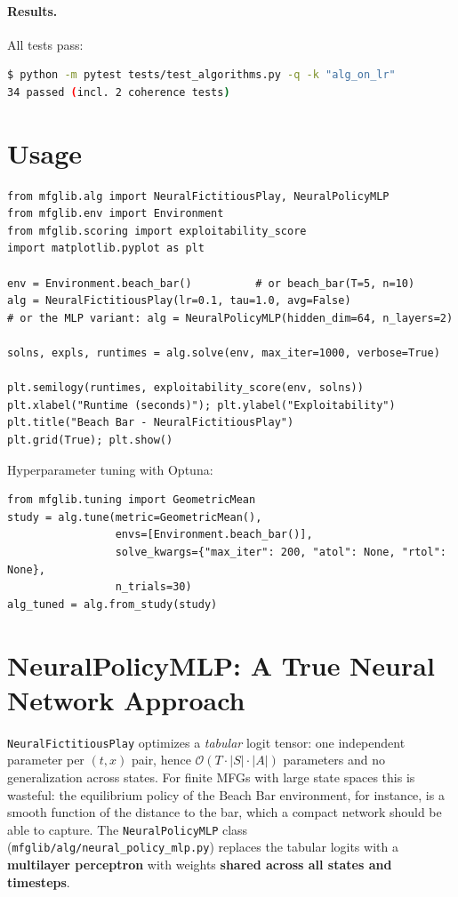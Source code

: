 \documentclass[11pt,a4paper]{article}
\begin{document}
\paragraph{Results.} All tests pass:
\begin{lstlisting}[language=bash]
$ python -m pytest tests/test_algorithms.py -q -k "alg_on_lr"
34 passed (incl. 2 coherence tests)
\end{lstlisting}

\section{Usage}

\begin{lstlisting}[style=py, caption={Solving the Beach Bar environment}]
from mfglib.alg import NeuralFictitiousPlay, NeuralPolicyMLP
from mfglib.env import Environment
from mfglib.scoring import exploitability_score
import matplotlib.pyplot as plt

env = Environment.beach_bar()          # or beach_bar(T=5, n=10)
alg = NeuralFictitiousPlay(lr=0.1, tau=1.0, avg=False)
# or the MLP variant: alg = NeuralPolicyMLP(hidden_dim=64, n_layers=2)

solns, expls, runtimes = alg.solve(env, max_iter=1000, verbose=True)

plt.semilogy(runtimes, exploitability_score(env, solns))
plt.xlabel("Runtime (seconds)"); plt.ylabel("Exploitability")
plt.title("Beach Bar - NeuralFictitiousPlay")
plt.grid(True); plt.show()
\end{lstlisting}

Hyperparameter tuning with Optuna:
\begin{lstlisting}[style=py]
from mfglib.tuning import GeometricMean
study = alg.tune(metric=GeometricMean(),
                 envs=[Environment.beach_bar()],
                 solve_kwargs={"max_iter": 200, "atol": None, "rtol": None},
                 n_trials=30)
alg_tuned = alg.from_study(study)
\end{lstlisting}

\section{NeuralPolicyMLP: A True Neural Network Approach}\label{sec:mlp}

\texttt{NeuralFictitiousPlay} optimizes a \emph{tabular} logit tensor: one
independent parameter per $(t, x)$ pair, hence $\mathcal{O}(T \cdot |S| \cdot |A|)$
parameters and no generalization across states. For finite MFGs with large
state spaces this is wasteful: the equilibrium policy of the Beach Bar
environment, for instance, is a smooth function of the distance to the bar,
which a compact network should be able to capture. The
\texttt{NeuralPolicyMLP} class (\texttt{mfglib/alg/neural\_policy\_mlp.py})
replaces the tabular logits with a \textbf{multilayer perceptron} with weights
\textbf{shared across all states and timesteps}.
\end{document}
